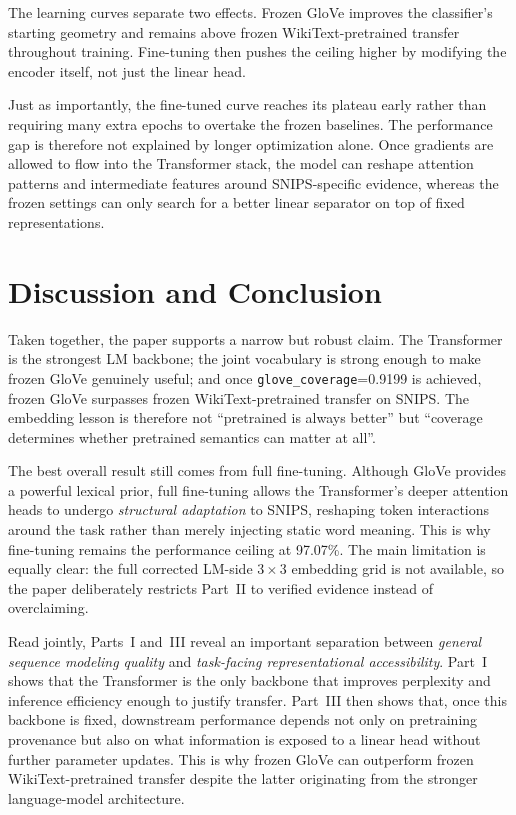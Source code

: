 \documentclass[10pt,a4paper]{article}
\begin{document}
The learning curves separate two effects. Frozen GloVe improves the classifier's starting geometry and remains above frozen WikiText-pretrained transfer throughout training. Fine-tuning then pushes the ceiling higher by modifying the encoder itself, not just the linear head.

Just as importantly, the fine-tuned curve reaches its plateau early rather than requiring many extra epochs to overtake the frozen baselines. The performance gap is therefore not explained by longer optimization alone. Once gradients are allowed to flow into the Transformer stack, the model can reshape attention patterns and intermediate features around SNIPS-specific evidence, whereas the frozen settings can only search for a better linear separator on top of fixed representations.


\section{Discussion and Conclusion}
\label{sec:conclusion}

Taken together, the paper supports a narrow but robust claim. The Transformer is the strongest LM backbone; the joint vocabulary is strong enough to make frozen GloVe genuinely useful; and once \texttt{glove\_coverage}=0.9199 is achieved, frozen GloVe surpasses frozen WikiText-pretrained transfer on SNIPS. The embedding lesson is therefore not ``pretrained is always better'' but ``coverage determines whether pretrained semantics can matter at all''.

The best overall result still comes from full fine-tuning. Although GloVe provides a powerful lexical prior, full fine-tuning allows the Transformer's deeper attention heads to undergo \emph{structural adaptation} to SNIPS, reshaping token interactions around the task rather than merely injecting static word meaning. This is why fine-tuning remains the performance ceiling at 97.07\%. The main limitation is equally clear: the full corrected LM-side $3 \times 3$ embedding grid is not available, so the paper deliberately restricts Part~II to verified evidence instead of overclaiming.

Read jointly, Parts~I and~III reveal an important separation between \emph{general sequence modeling quality} and \emph{task-facing representational accessibility}. Part~I shows that the Transformer is the only backbone that improves perplexity and inference efficiency enough to justify transfer. Part~III then shows that, once this backbone is fixed, downstream performance depends not only on pretraining provenance but also on what information is exposed to a linear head without further parameter updates. This is why frozen GloVe can outperform frozen WikiText-pretrained transfer despite the latter originating from the stronger language-model architecture.
\end{document}
